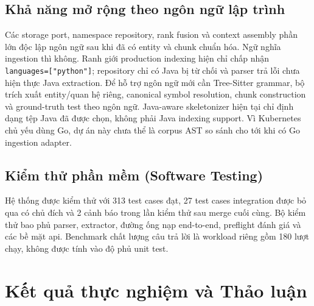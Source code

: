 \documentclass[12pt,a4paper,oneside]{report}
\begin{document}
\section{Khả năng mở rộng theo ngôn ngữ lập trình}
Các storage port, namespace repository, rank fusion và context assembly phần lớn độc lập ngôn ngữ sau khi đã có entity và chunk chuẩn hóa. Ngữ nghĩa ingestion thì không. Ranh giới production indexing hiện chỉ chấp nhận \texttt{languages=["python"]}; repository chỉ có Java bị từ chối và parser trả lỗi chưa hiện thực Java extraction. Để hỗ trợ ngôn ngữ mới cần Tree-Sitter grammar, bộ trích xuất entity/quan hệ riêng, canonical symbol resolution, chunk construction và ground-truth test theo ngôn ngữ. Java-aware skeletonizer hiện tại chỉ định dạng tệp Java đã được chọn, không phải Java indexing support. Vì Kubernetes chủ yếu dùng Go, dự án này chưa thể là corpus AST so sánh cho tới khi có Go ingestion adapter.

\section{Kiểm thử phần mềm (Software Testing)}
Hệ thống được kiểm thử với 313 test cases đạt, 27 test cases integration được bỏ qua có chủ đích và 2 cảnh báo trong lần kiểm thử sau merge cuối cùng. Bộ kiểm thử bao phủ parser, extractor, đường ống nạp end-to-end, preflight đánh giá và các bề mặt \gls{api}. Benchmark chất lượng câu trả lời là workload riêng gồm 180 lượt chạy, không được tính vào độ phủ unit test.

\newpage

\chapter{Kết quả thực nghiệm và Thảo luận}
\end{document}
